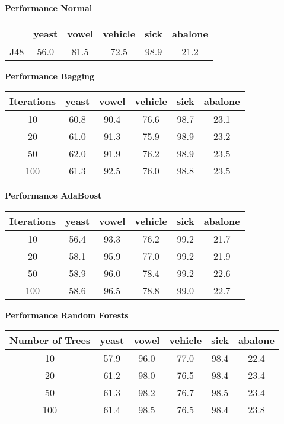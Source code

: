 \textbf{Performance Normal}

\begin{table}[htb]
	\centering
\begin{tabular}{l|c|c|c|c|c}
	             & yeast & vowel & vehicle &  sick & abalone  \\ \hline
J48              &  56.0 &  81.5 &  72.5   &  98.9 & 21.2     \\ 
\end{tabular}
\end{table}

\textbf{Performance Bagging}

\begin{table}[htb]
	\centering
\begin{tabular}{c|c|c|c|c|c}
Iterations       & yeast & vowel & vehicle &  sick & abalone     \\ \hline
10               &  60.8 & 90.4  &  76.6   & 98.7  &  23.1       \\ \hline
20               &  61.0 & 91.3  &  75.9   & 98.9  &  23.2       \\ \hline
50               &  62.0 & 91.9  &  76.2   & 98.9  &  23.5       \\ \hline
100              &  61.3 & 92.5  &  76.0   & 98.8  &  23.5       \\ 
\end{tabular}
\end{table}

\textbf{Performance AdaBoost}

\begin{table}[htb]
	\centering
\begin{tabular}{c|c|c|c|c|c}
Iterations       & yeast & vowel & vehicle &  sick & abalone     \\ \hline
10               & 56.4  &  93.3 &  76.2   &  99.2 &  21.7       \\ \hline
20               & 58.1  &  95.9 &  77.0   &  99.2 &  21.9       \\ \hline
50               & 58.9  &  96.0 &  78.4   &  99.2 &  22.6       \\ \hline
100              & 58.6  &  96.5 &  78.8   &  99.0 &  22.7       \\ 
\end{tabular}
\end{table}

\textbf{Performance Random Forests}
\begin{table}[h!]
	\centering
\begin{tabular}{c|c|c|c|c|c}
Number of Trees  & yeast & vowel & vehicle &  sick & abalone     \\ \hline
10               & 57.9  & 96.0  & 77.0    &  98.4 &  22.4       \\ \hline
20               & 61.2  & 98.0  & 76.5    &  98.4 &  23.4       \\ \hline
50               & 61.3  & 98.2  & 76.7    &  98.5 &  23.4       \\ \hline
100              & 61.4  & 98.5  & 76.5    &  98.4 &  23.8       \\ 
\end{tabular}
\end{table}

